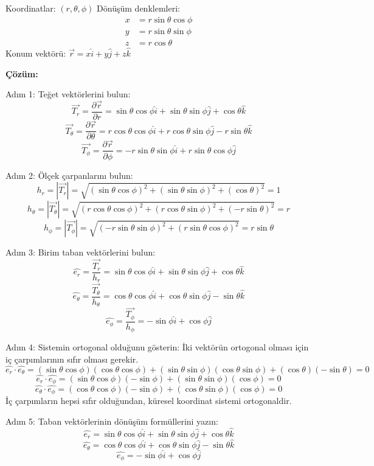 \documentclass[11pt,letterpaper]{article}
\begin{document}
Koordinatlar: $(r, \theta, \phi)$
Dönüşüm denklemleri:
\begin{align*}
x &= r \sin{\theta} \cos{\phi} \\
y &= r \sin{\theta} \sin{\phi} \\
z &= r \cos{\theta}
\end{align*}
Konum vektörü: $\vec{r} = x\hat{i} + y\hat{j} + z\hat{k}$

\textbf{Çözüm:}

Adım 1: Teğet vektörlerini bulun:
\[
\vec{T_r} = \frac{\partial \vec{r}}{\partial r} = \sin{\theta} \cos{\phi} \hat{i} + \sin{\theta} \sin{\phi} \hat{j} + \cos{\theta} \hat{k}
\]
\[
\vec{T_\theta} = \frac{\partial \vec{r}}{\partial \theta} = r \cos{\theta} \cos{\phi} \hat{i} + r \cos{\theta} \sin{\phi} \hat{j} - r \sin{\theta} \hat{k}
\]
\[
\vec{T_\phi} = \frac{\partial \vec{r}}{\partial \phi} = -r \sin{\theta} \sin{\phi} \hat{i} + r \sin{\theta} \cos{\phi} \hat{j}
\]

Adım 2: Ölçek çarpanlarını bulun:
\[
h_r = |\vec{T_r}| = \sqrt{(\sin{\theta} \cos{\phi})^2 + (\sin{\theta} \sin{\phi})^2 + (\cos{\theta})^2} = 1
\]
\[
h_\theta = |\vec{T_\theta}| = \sqrt{(r \cos{\theta} \cos{\phi})^2 + (r \cos{\theta} \sin{\phi})^2 + (-r \sin{\theta})^2} = r
\]
\[
h_\phi = |\vec{T_\phi}| = \sqrt{(-r \sin{\theta} \sin{\phi})^2 + (r \sin{\theta} \cos{\phi})^2} = r \sin{\theta}
\]

Adım 3: Birim taban vektörlerini bulun:
\[
\hat{e_r} = \frac{\vec{T_r}}{h_r} = \sin{\theta} \cos{\phi} \hat{i} + \sin{\theta} \sin{\phi} \hat{j} + \cos{\theta} \hat{k}
\]
\[
\hat{e_\theta} = \frac{\vec{T_\theta}}{h_\theta} = \cos{\theta} \cos{\phi} \hat{i} + \cos{\theta} \sin{\phi} \hat{j} - \sin{\theta} \hat{k}
\]
\[
\hat{e_\phi} = \frac{\vec{T_\phi}}{h_\phi} = -\sin{\phi} \hat{i} + \cos{\phi} \hat{j}
\]

Adım 4: Sistemin ortogonal olduğunu gösterin:
İki vektörün ortogonal olması için iç çarpımlarının sıfır olması gerekir.
\[
\hat{e_r} \cdot \hat{e_\theta} = (\sin{\theta} \cos{\phi})(\cos{\theta} \cos{\phi}) + (\sin{\theta} \sin{\phi})(\cos{\theta} \sin{\phi}) + (\cos{\theta})(-\sin{\theta}) = 0
\]
\[
\hat{e_r} \cdot \hat{e_\phi} = (\sin{\theta} \cos{\phi})(-\sin{\phi}) + (\sin{\theta} \sin{\phi})(\cos{\phi}) = 0
\]
\[
\hat{e_\theta} \cdot \hat{e_\phi} = (\cos{\theta} \cos{\phi})(-\sin{\phi}) + (\cos{\theta} \sin{\phi})(\cos{\phi}) = 0
\]
İç çarpımların hepsi sıfır olduğundan, küresel koordinat sistemi ortogonaldir.

Adım 5: Taban vektörlerinin dönüşüm formüllerini yazın:
\[
\hat{e_r} = \sin{\theta} \cos{\phi} \hat{i} + \sin{\theta} \sin{\phi} \hat{j} + \cos{\theta} \hat{k}
\]
\[
\hat{e_\theta} = \cos{\theta} \cos{\phi} \hat{i} + \cos{\theta} \sin{\phi} \hat{j} - \sin{\theta} \hat{k}
\]
\[
\hat{e_\phi} = -\sin{\phi} \hat{i} + \cos{\phi} \hat{j}
\]
\end{document}
